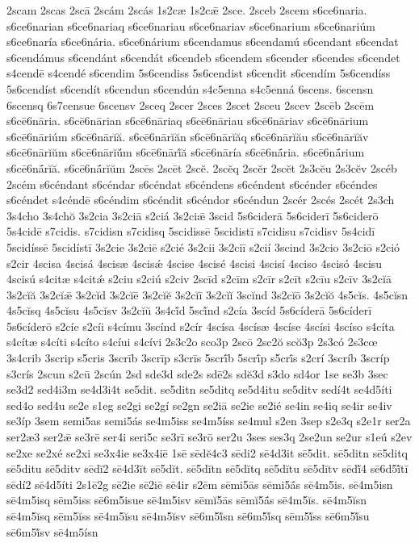 {2scam
2scas
2scā
2scám
2scás
1s2cæ
1s2cǣ
2sce.
2sceb
2scem
s6ce6naria.
s6ce6narian
s6ce6nariaq
s6ce6nariau
s6ce6nariav
s6ce6narium
s6ce6nariúm
s6ce6naría
s6ce6nária.
s6ce6nárium
s6cendamus
s6cendamú
s6cendant
s6cendat
s6cendámus
s6cendánt
s6cendát
s6cendeb
s6cendem
s6cender
s6cendes
s6cendet
s4cendē
s4cendé
s6cendim
5s6cendiss
5s6cendist
s6cendit
s6cendím
5s6cendíss
5s6cendíst
s6cendít
s6cendun
s6cendún
s4c5enna
s4c5enná
6scens.
6scensn
6scensq
6s7censue
6scensv
2sceq
2scer
2sces
2scet
2sceu
2scev
2scēb
2scēm
s6cē6nāria.
s6cē6nārian
s6cē6nāriaq
s6cē6nāriau
s6cē6nāriav
s6cē6nārium
s6cē6nāriúm
s6cē6nārĭă.
s6cē6nārĭăn
s6cē6nārĭăq
s6cē6nārĭău
s6cē6nārĭăv
s6cē6nārĭŭm
s6cē6nārĭŭ́m
s6cē6nārĭ́ă
s6cē6nāría
s6cē6nā́ria.
s6cē6nā́rium
s6cē6nā́rĭă.
s6cē6nā́rĭŭm
2scēs
2scēt
2scĕ.
2scĕq
2scĕr
2scĕt
2s3cĕu
2s3cĕv
2scéb
2scém
s6céndant
s6céndar
s6céndat
s6céndens
s6céndent
s6cénder
s6céndes
s6céndet
s4céndē
s6céndim
s6céndit
s6céndor
s6céndun
2scér
2scés
2scét
2s3ch
3s4cho
3s4chŏ
3s2cia
3s2ciā
s2ciá
3s2ciǣ
3scid
5s6ciderā
5s6ciderī
5s6ciderō
5s4cidē
s7cidis.
s7cidisn
s7cidisq
5scidissē
5scidistī
s7cidisu
s7cidisv
5s4cidī
5scidíssē
5scidístī
3s2cie
3s2ciē
s2cié
3s2cii
3s2ciī
s2cií
3scind
3s2cio
3s2ciō
s2ció
s2cir
4scisa
4scisá
4scisæ
4scisǽ
4scise
4scisé
4scisi
4scisí
4sciso
4scisó
4scisu
4scisú
s4citæ
s4citǽ
s2ciu
s2ciú
s2civ
2scīd
s2cīm
s2cīr
s2cīt
s2cīu
s2cīv
3s2cĭā
3s2cĭă
3s2cĭǣ
3s2cĭd
3s2cĭē
3s2cĭĕ
3s2cĭī
3s2cĭĭ
3scĭnd
3s2cĭō
3s2cĭŏ
4s5cĭs.
4s5cĭsn
4s5cĭsq
4s5cĭsu
4s5cĭsv
3s2cĭŭ
3s4cĭ́d
5scĭ́nd
s2cía
3scíd
5s6cíderā
5s6cíderī
5s6cíderō
s2cíe
s2cíi
s4címu
3scínd
s2cír
4scísa
4scísæ
4scíse
4scísi
4scíso
s4cíta
s4cítæ
s4cíti
s4cíto
s4cíui
s4cívi
2s3c2o
sco3p
2scō
2sc2ŏ
scŏ3p
2s3có
2s3cœ
3s4crib
3scrip
s5cris
3scrīb
3scrīp
s3crīs
5scrī́b
5scrī́p
s5crī́s
s2crí
3scríb
3scríp
s3crís
2scun
s2cū
2scún
2sd
sde3d
sde2s
sdē2s
sdĕ3d
s3do
sd4or
1se
se3b
3sec
se3d2
sed4i3m
se4d3i4t
se5dit.
se5ditn
se5ditq
se5d4itu
se5ditv
sedí4t
se4d5íti
sed4o
sed4u
se2e
s1eg
se2gi
se2gí
se2gn
se2iā
se2ie
se2ié
se4in
se4iq
se4ir
se4iv
se3íp
3sem
semi5as
semi5ás
se4m5iss
se4m5íss
se4mul
s2en
3sep
s2e3q
s2e1r
ser2a
ser2æ3
ser2ǣ
se3rē
ser4i
seri5c
se3rī
se3rō
ser2u
3ses
ses3q
2se2un
se2ur
s1eú
s2ev
se2xe
se2xé
se2xi
se3x4ie
se3x4iē
1sē
sēdĕ4c3
sēdi2
sē4d3it
sē5dit.
sē5ditn
sē5ditq
sē5ditu
sē5ditv
sēdĭ2
sē4d3ĭt
sē5dĭt.
sē5dĭtn
sē5dĭtq
sē5dĭtu
sē5dĭtv
sēdĭ́4
sē6d5ĭ́tĭ
sēdí2
sē4d5íti
2s1ē2g
sē2ie
sē2iē
sē4ir
s2ēm
sēmi5ās
sēmi5ā́s
sē4m5is.
sē4m5isn
sē4m5isq
sēm5iss
sē6m5isue
sē4m5isv
sēmĭ5ās
sēmĭ5ā́s
sē4m5ĭs.
sē4m5ĭsn
sē4m5ĭsq
sēm5ĭss
sē4m5ĭsu
sē4m5ĭsv
sē6m5ĭ́sn
sē6m5ĭ́sq
sēm5ĭ́ss
sē6m5ĭ́su
sē6m5ĭ́sv
sē4m5ísn
}
